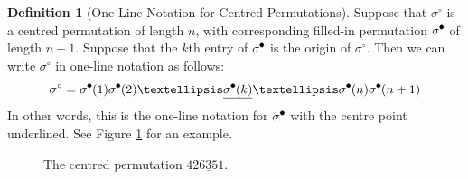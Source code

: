 \documentclass[11pt,a4paper]{article}
\newcommand{\plotptradius}{4pt}
\theoremstyle{definition}
\newtheorem{defn}[thm]{Definition}
\newtheorem{comment}[thm]{Comment}
\newcommand{\tikzcircle}[2][black,fill=black]{\tikz[baseline=-0.5ex]\draw[#1,radius=#2] (0,0) circle ;}
\begin{document}
\begin{defn}[One-Line Notation for Centred Permutations]
Suppose that $\sigma^{\circ}$ is a centred permutation of length $n$, with corresponding filled-in permutation $\sigma^{\tikzcircle{1.5pt}}$ of length $n+1$. Suppose that the $k$th entry of  $\sigma^{\tikzcircle{1.5pt}}$ is the origin of $\sigma^{\circ}$. Then we can write $\sigma^{\circ}$ in one-line notation as follows:
\[
\sigma^{\circ} = \sigma^{\tikzcircle{1.5pt}}(1)\sigma^{\tikzcircle{1.5pt}}(2)\dots\underline{\sigma^{\tikzcircle{1.5pt}}(k)}\dots\sigma^{\tikzcircle{1.5pt}}(n)\sigma^{\tikzcircle{1.5pt}}(n+1)
\]
In other words, this is the one-line notation for $\sigma^{\tikzcircle{1.5pt}}$ with the centre point underlined. See Figure \ref{fig:centred1} for an example.
\end{defn}

\begin{figure}[h]
\begin{center}
\end{center}
\caption{The centred permutation $426\underline{3}51$.}
\label{fig:centred1}
\end{figure}

\end{document}
